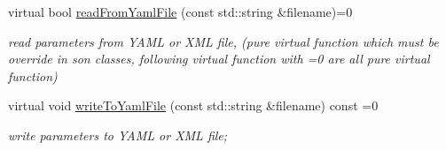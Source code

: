 \begin{DoxyCompactItemize}
virtual bool \hyperlink{classcamodocal_1_1Camera_1_1Parameters_a7968503df2a99e022a0c52bf7dafe531}{read\+From\+Yaml\+File} (const std\+::string \&filename)=0
\begin{DoxyCompactList}\small\item\em read parameters from Y\+A\+ML or X\+ML file, (pure virtual function which must be override in son classes, following virtual function with \textquotesingle{}=0\textquotesingle{} are all pure virtual function) \end{DoxyCompactList}\item 
virtual void \hyperlink{classcamodocal_1_1Camera_1_1Parameters_a7da3e505d5b047c7bfa3cf94d6c97710}{write\+To\+Yaml\+File} (const std\+::string \&filename) const =0
\begin{DoxyCompactList}\small\item\em write parameters to Y\+A\+ML or X\+ML file; \end{DoxyCompactList}\end{DoxyCompactItemize}
